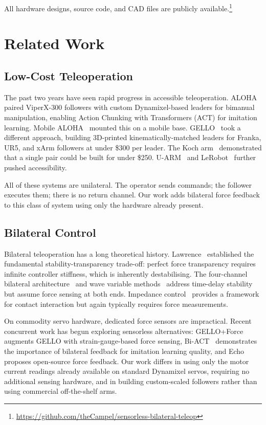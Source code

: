\documentclass[conference]{IEEEtran}
\begin{document}
All hardware designs, source code, and CAD files are publicly available.\footnote{\url{https://github.com/theCampel/sensorless-bilateral-teleop}}

\section{Related Work}

\subsection{Low-Cost Teleoperation}

The past two years have seen rapid progress in accessible teleoperation. ALOHA~\cite{zhao2023aloha} paired ViperX-300 followers with custom Dynamixel-based leaders for bimanual manipulation, enabling Action Chunking with Transformers (ACT) for imitation learning. Mobile ALOHA~\cite{fu2024mobile} mounted this on a mobile base. GELLO~\cite{wu_2024_gello} took a different approach, building 3D-printed kinematically-matched leaders for Franka, UR5, and xArm followers at under \$300 per leader. The Koch arm~\cite{koch2024} demonstrated that a single pair could be built for under \$250. U-ARM~\cite{zou_2025_uarm} and LeRobot~\cite{lerobot2025} further pushed accessibility.

All of these systems are unilateral. The operator sends commands; the follower executes them; there is no return channel. Our work adds bilateral force feedback to this class of system using only the hardware already present.

\subsection{Bilateral Control}

Bilateral teleoperation has a long theoretical history. Lawrence~\cite{lawrence_1993_stability} established the fundamental stability-transparency trade-off: perfect force transparency requires infinite controller stiffness, which is inherently destabilising. The four-channel bilateral architecture~\cite{hokayem2006} and wave variable methods~\cite{anderson1989} address time-delay stability but assume force sensing at both ends. Impedance control~\cite{hogan1985} provides a framework for contact interaction but again typically requires force measurements.

On commodity servo hardware, dedicated force sensors are impractical. Recent concurrent work has begun exploring sensorless alternatives: GELLO+Force~\cite{sujit_2025_improving} augments GELLO with strain-gauge-based force sensing, Bi-ACT~\cite{kobayashi2024} demonstrates the importance of bilateral feedback for imitation learning quality, and Echo~\cite{echo2025} proposes open-source force feedback. Our work differs in using only the motor current readings already available on standard Dynamixel servos, requiring no additional sensing hardware, and in building custom-scaled followers rather than using commercial off-the-shelf arms.
\end{document}
